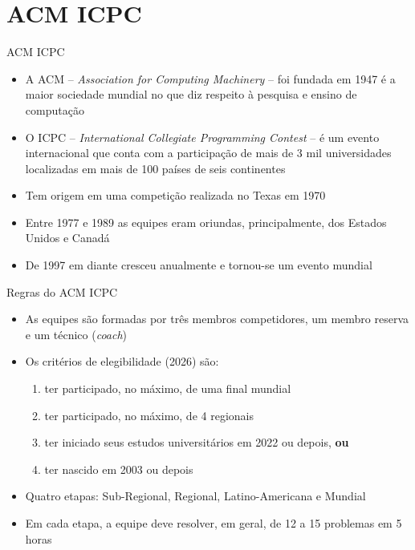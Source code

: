 \section{ACM ICPC}

\begin{frame}[fragile]{ACM ICPC}

    \begin{itemize}
        \item A ACM -- \textit{Association for Computing Machinery} -- foi fundada em 1947 é 
        a maior sociedade mundial no que diz respeito à pesquisa e ensino de computação
        \item O ICPC -- \textit{International Collegiate Programming Contest} -- é um evento
        internacional que conta com a participação de mais de 3 mil universidades localizadas em
        mais de 100 países de seis continentes
        \item Tem origem em uma competição realizada no Texas em 1970
        \item Entre 1977 e 1989 as equipes eram oriundas, principalmente, dos Estados Unidos e Canadá
        \item De 1997 em diante cresceu anualmente e tornou-se um evento mundial
    \end{itemize}

\end{frame}

\begin{frame}[fragile]{Regras do ACM ICPC}

    \begin{itemize}
        \item As equipes são formadas por três membros competidores, um membro reserva e um 
        técnico (\textit{coach})
        \item Os critérios de elegibilidade (2026) são:
            \begin{enumerate}
                \item ter participado, no máximo, de uma final mundial
                \item ter participado, no máximo, de 4 regionais
                \item ter iniciado seus estudos universitários em 2022 ou depois, \textbf{ou} 
                \item ter nascido em 2003 ou depois
            \end{enumerate}
        \item Quatro etapas: Sub-Regional, Regional, Latino-Americana e Mundial
        \item Em cada etapa, a equipe deve resolver, em geral, de 12 a 15 problemas em 5 horas
    \end{itemize}

\end{frame}

